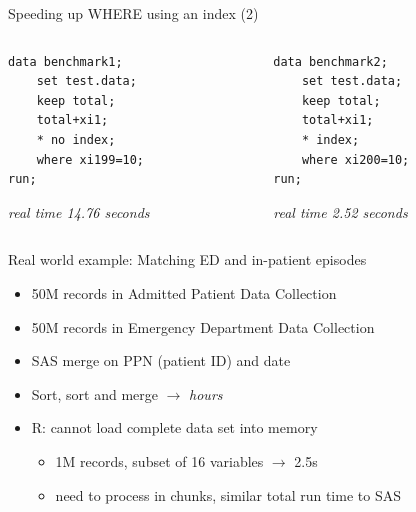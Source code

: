 \documentclass[aspectratio=169,12pt,usepdftitle=false]{beamer} %
\begin{document}
\begin{frame}[fragile]{Speeding up WHERE using an index (2)}
\begin{columns}
\begin{column}{0.5\textwidth}
\begin{verbatim}
data benchmark1;
    set test.data;
    keep total;
    total+xi1;
    * no index;
    where xi199=10;
run;
\end{verbatim}
\emph{real time 14.76 seconds}
\end{column}
\begin{column}{0.5\textwidth}
\begin{verbatim}
data benchmark2;
    set test.data;
    keep total;
    total+xi1;
    * index;
    where xi200=10;
run;
\end{verbatim}
\emph{real time 2.52 seconds}
\end{column}
\end{columns}
\end{frame}
{
\begin{frame}[plain]
\end{frame}
}

\begin{frame}{Real world example: Matching ED and in-patient episodes}
    \begin{itemize}
	\item 50M records in Admitted Patient Data Collection
	\item 50M records in Emergency Department Data Collection
	\item SAS merge on PPN (patient ID) and date
	\item Sort, sort and merge $\rightarrow$ \emph{hours}
	\item R: cannot load complete data set into memory
	    \begin{itemize}
		\item 1M records, subset of 16 variables $\rightarrow$ 2.5s
		\item need to process in chunks, similar total run time to SAS
	    \end{itemize}
    \end{itemize}
\end{frame}
\end{document}
